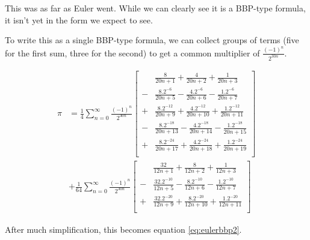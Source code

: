 \documentclass[11pt]{article}
\begin{document}
This was as far as Euler went. While we can clearly see it is a BBP-type formula, it isn't yet in the form we expect to see.

To write this as a single BBP-type formula, we can collect groups of terms (five for the first sum, three for the second) to get a common multiplier of $\frac{(-1)^n}{2^{30n}}$.

\begin{equation}
\begin{split}
  \pi
  &= \frac{1}{4} \sum_{n = 0}^\infty \frac{(-1)^n}{2^{30n}} \left[
    \begin{aligned}
    &  \frac{8}{20n+1}
    +  \frac{4}{20n+2}
    +  \frac{1}{20n+3} \\
    -& \frac{8.2^{-6}}{20n+5}
    -  \frac{4.2^{-6}}{20n+6}
    -  \frac{1.2^{-6}}{20n+7} \\
    +& \frac{8.2^{-12}}{20n+9}
    +  \frac{4.2^{-12}}{20n+10}
    +  \frac{1.2^{-12}}{20n+11} \\
    -& \frac{8.2^{-18}}{20n+13} 
    -  \frac{4.2^{-18}}{20n+14}
    -  \frac{1.2^{-18}}{20n+15} \\
    +& \frac{8.2^{-24}}{20n+17}
    +  \frac{4.2^{-24}}{20n+18}
    +  \frac{1.2^{-24}}{20n+19} \\
    \end{aligned}
  \right] \\
  &+ \frac{1}{64} \sum_{n = 0}^\infty \frac{(-1)^n}{2^{30n}} \left[
    \begin{aligned}
    &  \frac{32}{12n+1}
    +  \frac{8}{12n+2}
    +  \frac{1}{12n+3} \\
    -& \frac{32.2^{-10}}{12n+5}
    -  \frac{8.2^{-10}}{12n+6}
    -  \frac{1.2^{-10}}{12n+7} \\
    +& \frac{32.2^{-20}}{12n+9}
    +  \frac{8.2^{-20}}{12n+10}
    +  \frac{1.2^{-20}}{12n+11} \\
    \end{aligned}
  \right]
\end{split}
\end{equation}

After much simplification, this becomes equation \eqref{eq:eulerbbp2}.

\iffalse                        %
\end{document}

